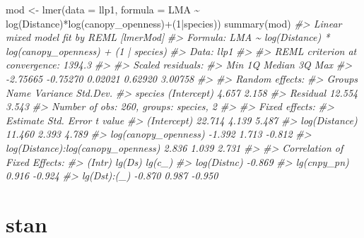 \documentclass[
]{article}
\newenvironment{Shaded}{\begin{snugshade}}{\end{snugshade}}
\newcommand{\AttributeTok}[1]{\textcolor[rgb]{0.77,0.63,0.00}{#1}}
\newcommand{\CommentTok}[1]{\textcolor[rgb]{0.56,0.35,0.01}{\textit{#1}}}
\newcommand{\DecValTok}[1]{\textcolor[rgb]{0.00,0.00,0.81}{#1}}
\newcommand{\FunctionTok}[1]{\textcolor[rgb]{0.00,0.00,0.00}{#1}}
\newcommand{\NormalTok}[1]{#1}
\newcommand{\OtherTok}[1]{\textcolor[rgb]{0.56,0.35,0.01}{#1}}
\newcommand{\SpecialCharTok}[1]{\textcolor[rgb]{0.00,0.00,0.00}{#1}}
\begin{document}
\begin{Shaded}
\begin{Highlighting}[]
\NormalTok{mod }\OtherTok{\textless{}{-}} \FunctionTok{lmer}\NormalTok{(}\AttributeTok{data =}\NormalTok{ llp1, }\AttributeTok{formula =}\NormalTok{ LMA }\SpecialCharTok{\textasciitilde{}} \FunctionTok{log}\NormalTok{(Distance)}\SpecialCharTok{*}\FunctionTok{log}\NormalTok{(canopy\_openness)}\SpecialCharTok{+}\NormalTok{(}\DecValTok{1}\SpecialCharTok{|}\NormalTok{species))}
\FunctionTok{summary}\NormalTok{(mod)}
\CommentTok{\#\textgreater{} Linear mixed model fit by REML [\textquotesingle{}lmerMod\textquotesingle{}]}
\CommentTok{\#\textgreater{} Formula: LMA \textasciitilde{} log(Distance) * log(canopy\_openness) + (1 | species)}
\CommentTok{\#\textgreater{}    Data: llp1}
\CommentTok{\#\textgreater{} }
\CommentTok{\#\textgreater{} REML criterion at convergence: 1394.3}
\CommentTok{\#\textgreater{} }
\CommentTok{\#\textgreater{} Scaled residuals: }
\CommentTok{\#\textgreater{}      Min       1Q   Median       3Q      Max }
\CommentTok{\#\textgreater{} {-}2.75665 {-}0.75270  0.02021  0.62920  3.00758 }
\CommentTok{\#\textgreater{} }
\CommentTok{\#\textgreater{} Random effects:}
\CommentTok{\#\textgreater{}  Groups   Name        Variance Std.Dev.}
\CommentTok{\#\textgreater{}  species  (Intercept)  4.657   2.158   }
\CommentTok{\#\textgreater{}  Residual             12.554   3.543   }
\CommentTok{\#\textgreater{} Number of obs: 260, groups:  species, 2}
\CommentTok{\#\textgreater{} }
\CommentTok{\#\textgreater{} Fixed effects:}
\CommentTok{\#\textgreater{}                                    Estimate Std. Error t value}
\CommentTok{\#\textgreater{} (Intercept)                          22.714      4.139   5.487}
\CommentTok{\#\textgreater{} log(Distance)                        11.460      2.393   4.789}
\CommentTok{\#\textgreater{} log(canopy\_openness)                 {-}1.392      1.713  {-}0.812}
\CommentTok{\#\textgreater{} log(Distance):log(canopy\_openness)    2.836      1.039   2.731}
\CommentTok{\#\textgreater{} }
\CommentTok{\#\textgreater{} Correlation of Fixed Effects:}
\CommentTok{\#\textgreater{}             (Intr) lg(Ds) lg(c\_)}
\CommentTok{\#\textgreater{} log(Distnc) {-}0.869              }
\CommentTok{\#\textgreater{} lg(cnpy\_pn)  0.916 {-}0.924       }
\CommentTok{\#\textgreater{} lg(Dst):(\_) {-}0.870  0.987 {-}0.950}
\end{Highlighting}
\end{Shaded}

\hypertarget{stan}{%
\section{stan}\label{stan}}
\end{document}
